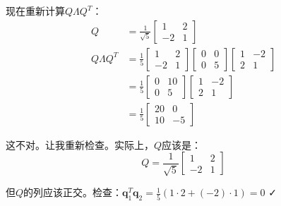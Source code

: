 \documentclass[12pt,a4paper]{article}
\begin{document}
现在重新计算$Q\Lambda Q^T$：
\begin{align}
Q &= \frac{1}{\sqrt{5}} \begin{bmatrix} 1 & 2 \\ -2 & 1 \end{bmatrix} \\
Q\Lambda Q^T &= \frac{1}{5} \begin{bmatrix} 1 & 2 \\ -2 & 1 \end{bmatrix} \begin{bmatrix} 0 & 0 \\ 0 & 5 \end{bmatrix} \begin{bmatrix} 1 & -2 \\ 2 & 1 \end{bmatrix} \\
&= \frac{1}{5} \begin{bmatrix} 0 & 10 \\ 0 & 5 \end{bmatrix} \begin{bmatrix} 1 & -2 \\ 2 & 1 \end{bmatrix} \\
&= \frac{1}{5} \begin{bmatrix} 20 & 0 \\ 10 & -5 \end{bmatrix}
\end{align}

这不对。让我重新检查。实际上，$Q$应该是：
\begin{equation}
Q = \frac{1}{\sqrt{5}} \begin{bmatrix} 1 & 2 \\ -2 & 1 \end{bmatrix}
\end{equation}

但$Q$的列应该正交。检查：$\bm{q}_1^T \bm{q}_2 = \frac{1}{5}(1 \cdot 2 + (-2) \cdot 1) = 0$ ✓
\end{document}
